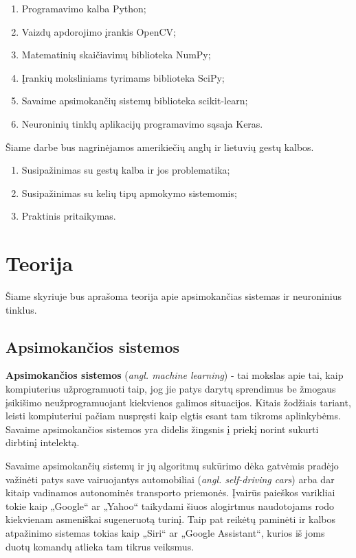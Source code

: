 \documentclass{VUMIFInfKursinis}
\begin{document}
\begin{enumerate}
	\item Programavimo kalba Python;
	\item Vaizdų apdorojimo įrankis OpenCV;
	\item Matematinių skaičiavimų biblioteka NumPy;
	\item Įrankių moksliniams tyrimams biblioteka SciPy;
	\item Savaime apsimokančių sistemų biblioteka scikit-learn;
	\item Neuroninių tinklų aplikacijų programavimo sąsaja Keras.
\end{enumerate}

Šiame darbe bus nagrinėjamos amerikiečių anglų ir lietuvių gestų kalbos.
\begin{enumerate}
	\item Susipažinimas su gestų kalba ir jos problematika;
	\item Susipažinimas su kelių tipų apmokymo sistemomis;
	\item Praktinis pritaikymas.
\end{enumerate}


\section{Teorija}
Šiame skyriuje bus aprašoma teorija apie apsimokančias sistemas ir neuroninius tinklus.

\subsection{Apsimokančios sistemos}

\textbf{Apsimokančios sistemos} (\textit{angl. machine learning}) - tai mokslas apie tai, kaip kompiuterius užprogramuoti taip, jog jie patys darytų sprendimus be žmogaus įsikišimo neužprogramuojant kiekvienos galimos situacijos. Kitais žodžiais tariant, leisti kompiuteriui pačiam nuspręsti kaip elgtis esant tam tikroms aplinkybėms. Savaime apsimokančios sistemos yra didelis žingsnis į priekį norint sukurti dirbtinį intelektą.

Savaime apsimokančių sistemų ir jų algoritmų sukūrimo dėka gatvėmis pradėjo važinėti patys save vairuojantys automobiliai (\textit{angl. self-driving cars}) arba dar kitaip vadinamos autonominės transporto priemonės. Įvairūs paieškos varikliai tokie kaip „Google“ ar „Yahoo“ taikydami šiuos alogirtmus naudotojams rodo kiekvienam asmeniškai sugeneruotą turinį. Taip pat reikėtų paminėti ir kalbos atpažinimo sistemas tokias kaip „Siri“ ar „Google Assistant“, kurios iš joms duotų komandų atlieka tam tikrus veiksmus.
\end{document}
